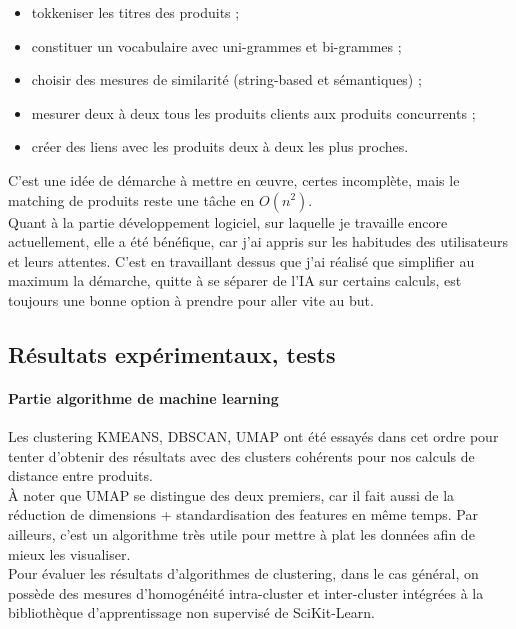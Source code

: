 \documentclass{rapportCS}
\begin{document}
\begin{itemize}
  \item tokkeniser les titres des produits ;
  \item constituer un vocabulaire avec uni-grammes et bi-grammes ;
  \item choisir des mesures de similarité (string-based et sémantiques) ;
  \item mesurer deux à deux tous les produits clients aux produits concurrents ;
  \item créer des liens avec les produits deux à deux les plus proches.
\end{itemize}
C'est une idée de démarche à mettre en œuvre, certes incomplète, mais le matching de produits
reste une tâche en $O(n^2)$. \\

Quant à la partie développement logiciel, sur laquelle je travaille encore actuellement, elle a été bénéfique, car 
j'ai appris sur les habitudes des utilisateurs et leurs attentes. C'est en travaillant dessus que j'ai réalisé
que simplifier au maximum la démarche, quitte à se séparer de l'IA sur certains calculs, est toujours une bonne
option à prendre pour aller vite au but.


\subsection{Résultats expérimentaux, tests}
\paragraph{Partie algorithme de machine learning}
Les clustering KMEANS, DBSCAN, UMAP ont été essayés dans cet ordre pour
tenter d'obtenir des résultats avec des clusters cohérents pour nos calculs
de distance entre produits.\\
À noter que UMAP se distingue des deux premiers, car il fait aussi de la réduction
de dimensions + standardisation des features en même temps.
Par ailleurs, c'est un algorithme très utile pour mettre à plat les données afin de mieux les visualiser.\\

Pour évaluer les résultats d'algorithmes de clustering, dans le cas général,
on possède des mesures d'homogénéité intra-cluster et inter-cluster intégrées à la bibliothèque
d'apprentissage non supervisé de SciKit-Learn.\\
\end{document}
